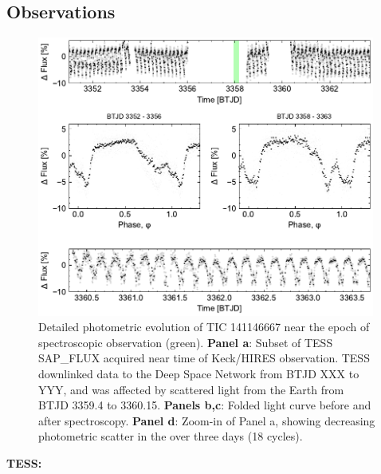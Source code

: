 \documentclass{nature3}
\begin{document}

\newpage
\begin{methods}

\renewcommand{\figurename}{Extended Data Figure}
\renewcommand{\tablename}{Extended Data Table}
\setcounter{table}{0}  
\setcounter{figure}{0}  


\section{Observations}

\begin{figure}[!b]
  \centering
  \includegraphics[width=0.99\textwidth]{figures/sf1.pdf}
  \caption{Detailed photometric evolution of TIC 141146667 near the
  epoch of spectroscopic observation (green). 
  {\bf Panel a}: Subset of TESS SAP\_FLUX acquired near time of
  Keck/HIRES observation.
  TESS downlinked data to the Deep Space Network from BTJD XXX to
  YYY, and was affected by scattered light from the Earth from BTJD
  3359.4 to 3360.15.
  {\bf Panels b,c}: Folded light curve before and after spectroscopy.
  {\bf Panel d}: Zoom-in of Panel a, showing decreasing photometric
  scatter in the over three days (18 cycles).
  }
  \label{fig:fulllc}
\end{figure}

{\bf TESS:}


\end{methods}
\end{document}
